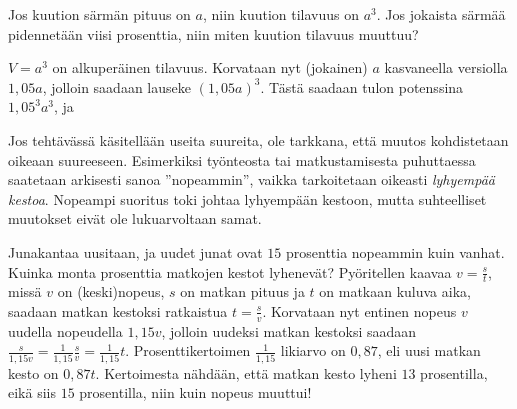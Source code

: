 \begin{esimerkki}
Jos kuution särmän pituus on $a$, niin kuution tilavuus on $a^3$. Jos jokaista särmää pidennetään viisi prosenttia, niin miten kuution tilavuus muuttuu?
	\begin{esimratk}
	$V=a^3$ on alkuperäinen tilavuus. Korvataan nyt (jokainen) $a$ kasvaneella versiolla $1,05a$, jolloin saadaan lauseke $(1,05a)^3$. Tästä saadaan tulon potenssina $1,05^3a^3$, ja
	\end{esimratk}
\end{esimerkki}

Jos tehtävässä käsitellään useita suureita, ole tarkkana, että muutos kohdistetaan oikeaan suureeseen. Esimerkiksi työnteosta tai matkustamisesta puhuttaessa saatetaan arkisesti sanoa ''nopeammin'', vaikka tarkoitetaan oikeasti \textit{lyhyempää kestoa}. Nopeampi suoritus toki johtaa lyhyempään kestoon, mutta suhteelliset muutokset eivät ole lukuarvoltaan samat.

\begin{esimerkki}
Junakantaa uusitaan, ja uudet junat ovat $15$ prosenttia nopeammin kuin vanhat. Kuinka monta prosenttia matkojen kestot lyhenevät? Pyöritellen kaavaa $v=\frac{s}{t}$, missä $v$ on (keski)nopeus, $s$ on matkan pituus ja $t$ on matkaan kuluva aika, saadaan matkan kestoksi ratkaistua $t=\frac{s}{v}$. Korvataan nyt entinen nopeus $v$ uudella nopeudella $1,15v$, jolloin uudeksi matkan kestoksi saadaan $\frac{s}{1,15v}=\frac{1}{1,15}\frac{s}{v}=\frac{1}{1,15}t$. Prosenttikertoimen $\frac{1}{1,15}$ likiarvo on $0,87$, eli uusi matkan kesto on $0,87t$. Kertoimesta nähdään, että matkan kesto lyheni $13$ prosentilla, eikä siis $15$ prosentilla, niin kuin nopeus muuttui!
\end{esimerkki}

